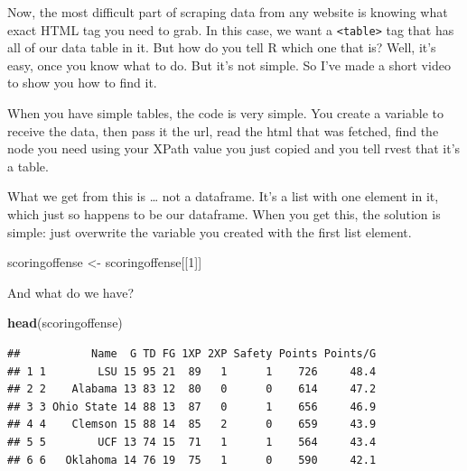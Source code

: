\documentclass[]{book}
\newenvironment{Shaded}{\begin{snugshade}}{\end{snugshade}}
\newcommand{\DataTypeTok}[1]{\textcolor[rgb]{0.13,0.29,0.53}{#1}}
\newcommand{\DecValTok}[1]{\textcolor[rgb]{0.00,0.00,0.81}{#1}}
\newcommand{\KeywordTok}[1]{\textcolor[rgb]{0.13,0.29,0.53}{\textbf{#1}}}
\newcommand{\NormalTok}[1]{#1}
\newcommand{\OperatorTok}[1]{\textcolor[rgb]{0.81,0.36,0.00}{\textbf{#1}}}
\newcommand{\StringTok}[1]{\textcolor[rgb]{0.31,0.60,0.02}{#1}}
\begin{document}
Now, the most difficult part of scraping data from any website is knowing what exact HTML tag you need to grab. In this case, we want a \texttt{\textless{}table\textgreater{}} tag that has all of our data table in it. But how do you tell R which one that is? Well, it's easy, once you know what to do. But it's not simple. So I've made a short video to show you how to find it.

When you have simple tables, the code is very simple. You create a variable to receive the data, then pass it the url, read the html that was fetched, find the node you need using your XPath value you just copied and you tell rvest that it's a table.

\begin{Shaded}
\end{Shaded}

What we get from this is \ldots{} not a dataframe. It's a list with one element in it, which just so happens to be our dataframe. When you get this, the solution is simple: just overwrite the variable you created with the first list element.

\begin{Shaded}
\begin{Highlighting}[]
\NormalTok{scoringoffense <-}\StringTok{ }\NormalTok{scoringoffense[[}\DecValTok{1}\NormalTok{]]}
\end{Highlighting}
\end{Shaded}

And what do we have?

\begin{Shaded}
\begin{Highlighting}[]
\KeywordTok{head}\NormalTok{(scoringoffense)}
\end{Highlighting}
\end{Shaded}

\begin{verbatim}
##           Name  G TD FG 1XP 2XP Safety Points Points/G
## 1 1        LSU 15 95 21  89   1      1    726     48.4
## 2 2    Alabama 13 83 12  80   0      0    614     47.2
## 3 3 Ohio State 14 88 13  87   0      1    656     46.9
## 4 4    Clemson 15 88 14  85   2      0    659     43.9
## 5 5        UCF 13 74 15  71   1      1    564     43.4
## 6 6   Oklahoma 14 76 19  75   1      0    590     42.1
\end{verbatim}
\end{document}

